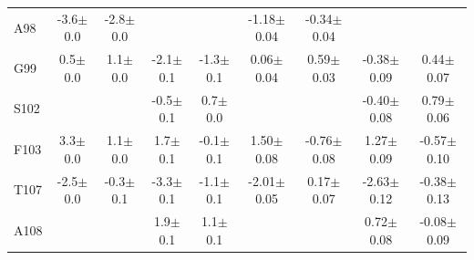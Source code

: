 \documentclass[%
 aip,
 amsmath,amssymb,
 preprint,%
]{revtex4-1}
\begin{document}
\begin{center}
\begin{longtable}{l|c|c|c|c|c|c|c|c}
A98 & -3.6$\pm$0.0 & -2.8$\pm$0.0 & & & -1.18$\pm$0.04 & -0.34$\pm$0.04 & & \\
G99 & 0.5$\pm$0.0 & 1.1$\pm$0.0 & -2.1$\pm$0.1 & -1.3$\pm$0.1 & 0.06$\pm$0.04 & 0.59$\pm$0.03 & -0.38$\pm$0.09 & 0.44$\pm$0.07 \\
S102 & & & -0.5$\pm$0.1 & 0.7$\pm$0.0 & & & -0.40$\pm$0.08 & 0.79$\pm$0.06 \\
F103 & 3.3$\pm$0.0 & 1.1$\pm$0.0 & 1.7$\pm$0.1 & -0.1$\pm$0.1 & 1.50$\pm$0.08 & -0.76$\pm$0.08 & 1.27$\pm$0.09 & -0.57$\pm$0.10 \\
T107 & -2.5$\pm$0.0 & -0.3$\pm$0.1 & -3.3$\pm$0.1 & -1.1$\pm$0.1 & -2.01$\pm$0.05 & 0.17$\pm$0.07 & -2.63$\pm$0.12 & -0.38$\pm$0.13 \\
A108 & & & 1.9$\pm$0.1 & 1.1$\pm$0.1 & & & 0.72$\pm$0.08 & -0.08$\pm$0.09 \\
\end{longtable}
\end{center}
\endgroup

\clearpage

\end{document}
